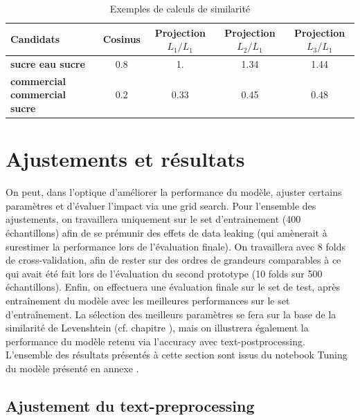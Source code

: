             \begin{table}[hbtp]
            \begin{center}
            \begin{small}
            \begin{tabular}{lcccc}
                \toprule
                \textbf{Candidats} &  \textbf{Cosinus} &  \textbf{Projection $L_{1}/L_{1}$} & \textbf{Projection $L_{2}/L_{1}$} & \textbf{Projection $L_{3}/L_{1}$}\\
                \midrule
                \textbf{sucre eau sucre} &  0.8 & 1. & 1.34 & 1.44 \\
                \textbf{commercial commercial sucre} & 0.2 & 0.33 & 0.45 & 0.48 \\
                \bottomrule
            \end{tabular}
            \end{small}
            \caption{Exemples de calculs de similarité}
            \label{tbl:similarites_exemples}
            \end{center}
            \end{table}

    \section{Ajustements et résultats}
            
    On peut, dans l'optique d'améliorer la performance du modèle, ajuster certains paramètres et d'évaluer l'impact via une grid search.
    Pour l'ensemble des ajustements, on travaillera uniquement sur le set d'entrainement (400 échantillons) afin de se prémunir des effets de data leaking (qui amènerait à surestimer la performance lors de l'évaluation finale).
    On travaillera avec 8 folds de cross-validation, afin de rester sur des ordres de grandeurs comparables à ce qui avait été fait lors de l'évaluation du second prototype (10 folds sur 500 échantillons).
    Enfin, on effectuera une évaluation finale sur le set de test, après entraînement du modèle avec les meilleures performances sur le set d'entraînement.
    La sélection des meilleurs paramètres se fera sur la base de la similarité de Levenshtein (cf. chapitre ), mais on illustrera également la performance du modèle retenu via l'accuracy avec text-postprocessing.
    L'ensemble des résultats présentés à cette section sont issus du notebook \og Tuning du modèle \fg présenté en annexe .

        \subsection{Ajustement du text-preprocessing}

